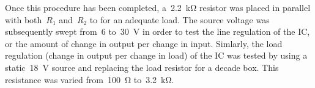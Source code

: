 Once this procedure has been completed,
a~\SI{2.2}{\kilo\ohm} resistor was placed in parallel with both~$R_1$ and~$R_2$
to for an adequate load.  The source voltage was subsequently swept from~6
to~\SI{30}{\volt} in order to test the line regulation of the IC, or the amount
of change in output per change in input.  Simlarly, the load regulation (change
in output per change in load) of the IC was tested by using a
static~\SI{18}{\volt} source and replacing the load resistor for a decade box.
This resistance was varied from~\SI{100}{\ohm} to~\SI{3.2}{\kilo\ohm}.

\begin{figure}[H]
	\centering
	
	\caption{}
	\label{fig:vrLineReg}
\end{figure}

\begin{figure}[H]
	\centering
	
	\caption{}
	\label{fig:vrLoadReg}
\end{figure}

\begin{figure}[H]
	\centering
	
	\caption{}
	\label{fig:fullLoadReg}
\end{figure}
